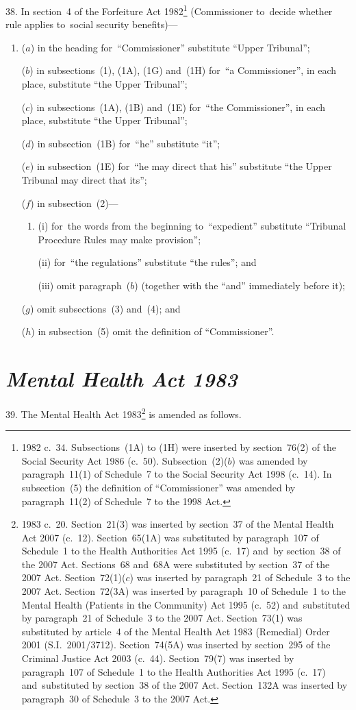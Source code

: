 \documentclass[12pt,a4paper]{article}
\begin{document}
38.  In section~4 of the Forfeiture Act 1982\footnote{1982 c.~34. Subsections~(1A) to (1H) were inserted by section~76(2) of the Social Security Act 1986 (c.~50). Subsection~(2)($b$) was amended by paragraph~11(1) of Schedule~7 to the Social Security Act 1998 (c.~14). In subsection~(5) the definition of “Commissioner” was amended by paragraph~11(2) of Schedule~7 to the 1998 Act.} (Commissioner to~decide whether rule applies to~social security benefits)—
\begin{enumerate}\item[]
($a$) in the heading for~“Commissioner” substitute “Upper Tribunal”;

($b$) in subsections~(1), (1A), (1G) and~(1H) for~“a Commissioner”, in each place, substitute “the Upper Tribunal”;

($c$) in subsections~(1A), (1B) and~(1E) for~“the Commissioner”, in each place, substitute “the Upper Tribunal”;

($d$) in subsection~(1B) for~“he” substitute “it”;

($e$) in subsection~(1E) for~“he may direct that his” substitute “the Upper Tribunal may direct that its”;

($f$) in subsection~(2)—
\begin{enumerate}\item[]
(i) for~the words from the beginning to~“expedient” substitute “Tribunal Procedure Rules may make provision”;

(ii) for~“the regulations” substitute “the rules”; and

(iii) omit paragraph~($b$)  (together with the “and” immediately before it);
\end{enumerate}

($g$) omit subsections~(3) and~(4); and

($h$) in subsection~(5) omit the definition of “Commissioner”.
\end{enumerate}

\section*{\itshape Mental Health Act 1983}

39.  The Mental Health Act 1983\footnote{1983 c.~20. Section~21(3) was inserted by section~37 of the Mental Health Act 2007 (c.~12). Section~65(1A) was substituted by paragraph~107 of Schedule~1 to the Health Authorities Act 1995 (c.~17) and~by section~38 of the 2007 Act. Sections~68 and~68A were substituted by section~37 of the 2007 Act. Section~72(1)($c$) was inserted by paragraph~21 of Schedule~3 to the 2007 Act. Section~72(3A) was inserted by paragraph~10 of Schedule~1 to the Mental Health (Patients in the Community) Act 1995 (c.~52) and~substituted by paragraph~21 of Schedule~3 to the 2007 Act. Section~73(1) was substituted by article~4 of the Mental Health Act 1983 (Remedial) Order 2001 (S.I.~2001/3712). Section~74(5A) was inserted by section~295 of the Criminal Justice Act 2003 (c.~44). Section~79(7) was inserted by paragraph~107 of Schedule~1 to the Health Authorities Act 1995 (c.~17) and~substituted by section~38 of the 2007 Act. Section~132A was inserted by paragraph~30 of Schedule~3 to the 2007 Act.} is amended as follows.
\end{document}
